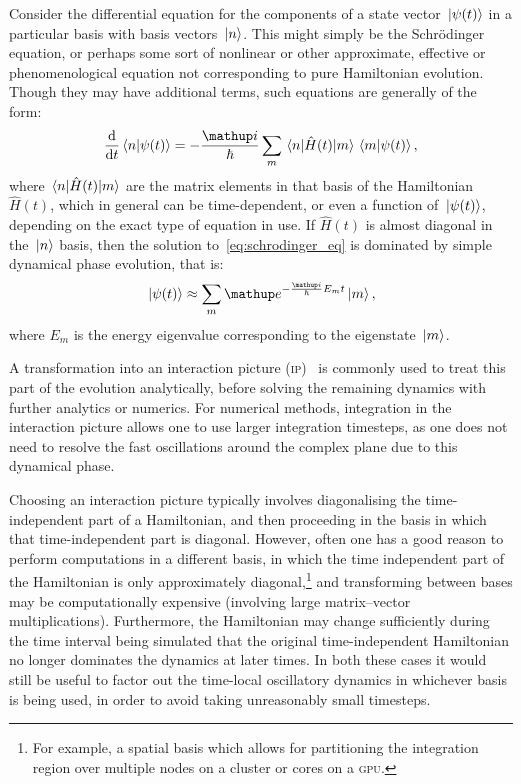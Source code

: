 Consider the differential equation for the components of a state vector $\ket{\psi(t)}$ in a particular basis with basis vectors $\ket{n}$. This might simply be the Schr\"odinger equation, or perhaps some sort of nonlinear or other approximate, effective or phenomenological equation not corresponding to pure Hamiltonian evolution. Though they may have additional terms, such equations are generally of the form:
\begin{align}\label{eq:schrodinger_eq}
\dv t \braket{n}{\psi(t)} = -\frac \ii \hbar \sum_m \matrixel{n}{\hat H(t)}{m} \braket{m}{\psi(t)},
\end{align}
where $\matrixel{n}{\hat H(t)}{m}$ are the matrix elements in that basis of the Hamiltonian $\hat H(t)$, which in general can be time-dependent, or even a function of $\ket{\psi(t)}$, depending on the exact type of equation in use. If $\hat H(t)$ is almost diagonal in the $\ket{n}$ basis, then the solution to~\eqref{eq:schrodinger_eq} is dominated by simple dynamical phase evolution, that is:
\begin{align}
\ket{\psi(t)} \approx \sum_m \ee^{-\frac \ii \hbar E_m t}\ket{m},
\end{align}
where $E_m$ is the energy eigenvalue corresponding to the eigenstate $\ket{m}$.

A transformation into an interaction picture (\textsc{ip})~\cite[p.~317]{sakurai} is commonly used to treat this part of the evolution analytically, before solving the remaining dynamics with further analytics or numerics. For numerical methods, integration in the interaction picture allows one to use larger integration timesteps, as one does not need to resolve the fast oscillations around the complex plane due to this dynamical phase.

Choosing an interaction picture typically involves diagonalising the time-independent part of a Hamiltonian, and then proceeding in the basis in which that time-independent part is diagonal. However, often one has a good reason to perform computations in a different basis, in which the time independent part of the Hamiltonian is only approximately diagonal,\footnote{For example, a spatial basis which allows for partitioning the integration region over multiple nodes on a cluster or cores on a \textsc{gpu}.} and transforming between bases may be computationally expensive (involving large matrix--vector multiplications). Furthermore, the Hamiltonian may change sufficiently during the time interval being simulated that the original time-independent Hamiltonian no longer dominates the dynamics at later times. In both these cases it would still be useful to factor out the time-local oscillatory dynamics in whichever basis is being used, in order to avoid taking unreasonably small timesteps.


